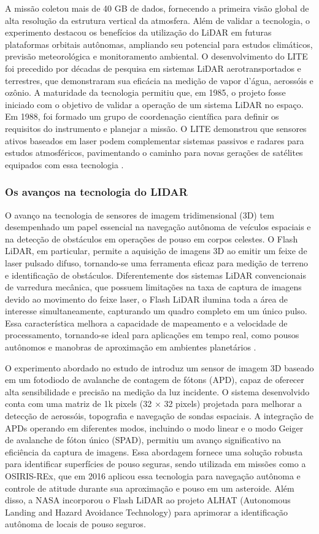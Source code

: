 A missão coletou mais de 40 GB de dados, fornecendo a primeira visão global de alta resolução da estrutura vertical da atmosfera. Além de validar a tecnologia, o experimento destacou os benefícios da utilização do LiDAR em futuras plataformas orbitais autônomas, ampliando seu potencial para estudos climáticos, previsão meteorológica e monitoramento ambiental. O desenvolvimento do LITE foi precedido por décadas de pesquisa em sistemas LiDAR aerotransportados e terrestres, que demonstraram sua eficácia na medição de vapor d'água, aerossóis e ozônio. A maturidade da tecnologia permitiu que, em 1985, o projeto fosse iniciado com o objetivo de validar a operação de um sistema LiDAR no espaço. Em 1988, foi formado um grupo de coordenação científica para definir os requisitos do instrumento e planejar a missão. O LITE demonstrou que sensores ativos baseados em laser podem complementar sistemas passivos e radares para estudos atmosféricos, pavimentando o caminho para novas gerações de satélites equipados com essa tecnologia \cite{winker1996}.

\subsubsection{Os avanços na tecnologia do LIDAR}

O avanço na tecnologia de sensores de imagem tridimensional (3D) tem desempenhado um papel essencial na navegação autônoma de veículos espaciais e na detecção de obstáculos em operações de pouso em corpos celestes. O Flash LiDAR, em particular, permite a aquisição de imagens 3D ao emitir um feixe de laser pulsado difuso, tornando-se uma ferramenta eficaz para medição de terreno e identificação de obstáculos. Diferentemente dos sistemas LiDAR convencionais de varredura mecânica, que possuem limitações na taxa de captura de imagens devido ao movimento do feixe laser, o Flash LiDAR ilumina toda a área de interesse simultaneamente, capturando um quadro completo em um único pulso. Essa característica melhora a capacidade de mapeamento e a velocidade de processamento, tornando-se ideal para aplicações em tempo real, como pousos autônomos e manobras de aproximação em ambientes planetários \cite{mizuno2020}.

O experimento abordado no estudo de \cite{mizuno2020} introduz um sensor de imagem 3D baseado em um fotodiodo de avalanche de contagem de fótons (APD), capaz de oferecer alta sensibilidade e precisão na medição da luz incidente. O sistema desenvolvido conta com uma matriz de 1k pixels (32 × 32 pixels) projetada para melhorar a detecção de aerossóis, topografia e navegação de sondas espaciais. A integração de APDs operando em diferentes modos, incluindo o modo linear e o modo Geiger de avalanche de fóton único (SPAD), permitiu um avanço significativo na eficiência da captura de imagens. Essa abordagem fornece uma solução robusta para identificar superfícies de pouso seguras, sendo utilizada em missões como a OSIRIS-REx, que em 2016 aplicou essa tecnologia para navegação autônoma e controle de atitude durante sua aproximação e pouso em um asteroide. Além disso, a NASA incorporou o Flash LiDAR ao projeto ALHAT (Autonomous Landing and Hazard Avoidance Technology) para aprimorar a identificação autônoma de locais de pouso seguros.


